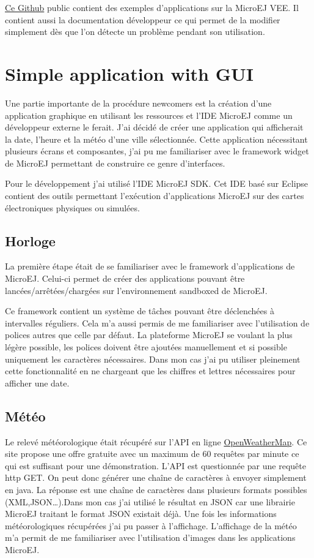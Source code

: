 \documentclass[french,a4paper,12pt]{report}
\begin{document}
\href{https://github.com/MicroEJ}{Ce Github} public contient des exemples d’applications sur la MicroEJ VEE. Il contient aussi la documentation développeur ce qui permet de la modifier simplement dès que l'on détecte un problème pendant son utilisation.

\section{Simple application with GUI}

Une partie importante de la procédure newcomers est la création d'une application graphique en utilisant les ressources et l'IDE MicroEJ comme un développeur externe le ferait. 
J'ai décidé de créer une application qui afficherait la date, l'heure et la météo d'une ville sélectionnée. Cette application nécessitant plusieurs écrans et composantes, j'ai pu me familiariser avec le framework widget de MicroEJ permettant de construire ce genre d'interfaces.

Pour le développement j'ai utilisé l'IDE MicroEJ SDK. Cet IDE basé sur Eclipse contient des outils permettant l’exécution d'applications MicroEJ sur des cartes électroniques physiques ou simulées.

\subsection{Horloge}

La première étape était de se familiariser avec le framework d’applications de MicroEJ. Celui-ci permet de créer des applications pouvant être lancées/arrêtées/chargées sur l’environnement sandboxed de MicroEJ. 

Ce framework contient un système de tâches pouvant être déclenchées à intervalles réguliers.
Cela m’a aussi permis de me familiariser avec l’utilisation de polices autres que celle par défaut. La plateforme MicroEJ se voulant la plus légère possible, les polices doivent être ajoutées manuellement et si possible uniquement les caractères nécessaires. Dans mon cas j’ai pu utiliser pleinement cette fonctionnalité en ne chargeant que les chiffres et lettres nécessaires pour afficher une date. 

\subsection{Météo}

Le relevé météorologique était récupéré sur l’API en ligne \href{https://openweathermap.org/}{OpenWeatherMap}. Ce site propose une offre gratuite avec un maximum de 60 requêtes par minute ce qui est suffisant pour une démonstration. L’API est questionnée par une requête http GET. On peut donc générer une chaîne de caractères à envoyer simplement en java. La réponse est une chaîne de caractères dans plusieurs formats possibles (XML,JSON…).Dans mon cas j’ai utilisé le résultat en JSON car une librairie MicroEJ traitant le format JSON existait déjà. 
Une fois les informations météorologiques récupérées j’ai pu passer à l’affichage. L’affichage de la météo m’a permit de me familiariser avec l’utilisation d’images dans les applications MicroEJ. 
\end{document}
